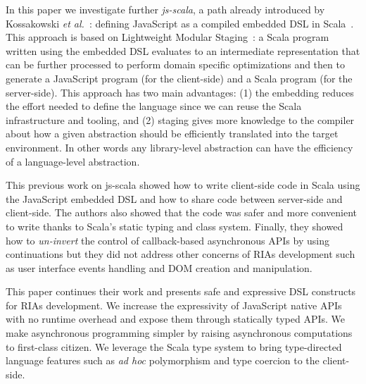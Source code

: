 \documentclass[american,english,runningheads]{llncs}
\newcommand{\etal}{\emph{et al.~}}
\begin{document}
In this paper we investigate further \emph{js-scala}, a path already introduced by Kossakowski \etal{}: defining
JavaScript as a compiled embedded DSL in Scala~\cite{Kossakowski12_JsDESL}. This approach is based on Lightweight
Modular Staging~\cite{Rompf12_LMSThesis}: a Scala program written using the embedded DSL evaluates to an intermediate
representation that can be further processed to perform domain specific optimizations and then to generate a
JavaScript program (for the client-side) and a Scala program (for the server-side). This approach has two main
advantages: (1) the embedding reduces the effort needed to define the language since we can reuse the Scala
infrastructure and tooling, and (2) staging gives more knowledge to the compiler about how a given abstraction
should be efficiently translated into the target environment. In other words any library-level abstraction can have
the efficiency of a language-level abstraction.

This previous work on js-scala showed how to write client-side code in Scala using the JavaScript embedded DSL and
how to share code between server-side and client-side. The authors also showed that the code was safer and more
convenient to write thanks to Scala's static typing and class system. Finally, they showed how to \emph{un-invert}
the control of callback-based asynchronous APIs by using continuations but they did not address other concerns of
RIAs development such as user interface events handling and DOM creation and manipulation.

This paper continues their work and presents safe and expressive DSL constructs for RIAs development. We increase the
expressivity of JavaScript native APIs with no runtime overhead and expose them through statically typed APIs. We
make asynchronous programming simpler by raising asynchronous computations to first-class citizen. We leverage the
Scala type system to bring type-directed language features such as \emph{ad hoc} polymorphism and type coercion to
the client-side.
\end{document}
